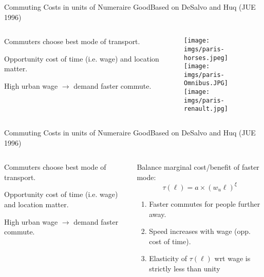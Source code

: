 \documentclass[aspectratio=169]{beamer}
\begin{document}
	

\begin{v75mins}
\begin{frame}{Commuting Costs in units of Numeraire Good}{Based on DeSalvo and Huq (JUE 1996)}

\begin{columns}
\begin{column}{0.5\textwidth}
\begin{midi}
\item Commuters choose best mode of transport.
\item Opportunity cost of time (i.e. wage) and location matter.
\item High urban wage $\rightarrow$ demand faster commute.
\end{midi}
\end{column}
\begin{column}{0.5\textwidth}

\texttt{[image: \\imgs/paris-horses.jpeg]}\\
\texttt{[image: \\imgs/paris-Omnibus.JPG]}\\
\texttt{[image: \\imgs/paris-renault.jpg]}

\end{column}
\end{columns}

\end{frame}

\begin{frame}{Commuting Costs in units of Numeraire Good}{Based on DeSalvo and Huq (JUE 1996)}

	\begin{columns}
	\begin{column}{0.5\textwidth}
	\begin{midi}
	\item Commuters choose best mode of transport.
	\item Opportunity cost of time (i.e. wage) and location matter.
	\item High urban wage $\rightarrow$ demand faster commute.
	\end{midi}
	\end{column}
	\begin{column}{0.5\textwidth}
	\begin{midi}
	\item Balance marginal cost/benefit of faster mode:
	\begin{equation*}
	\tau(\ell) = a \times (w_u \ell)^\xi
	\end{equation*}
	\begin{enumerate}
	\item Faster commutes for people further away.
	\item Speed increases with wage (opp. cost of time).
	\item Elasticity of $\tau(\ell)$ wrt wage is strictly less than unity%
	\end{enumerate}
	\end{midi}
	

\end{column}
\end{columns}
\end{frame}
\end{v75mins}
\end{document}
